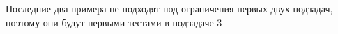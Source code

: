 Последние два примера не подходят под ограничения первых двух подзадач, поэтому они будут первыми тестами в подзадаче 3
